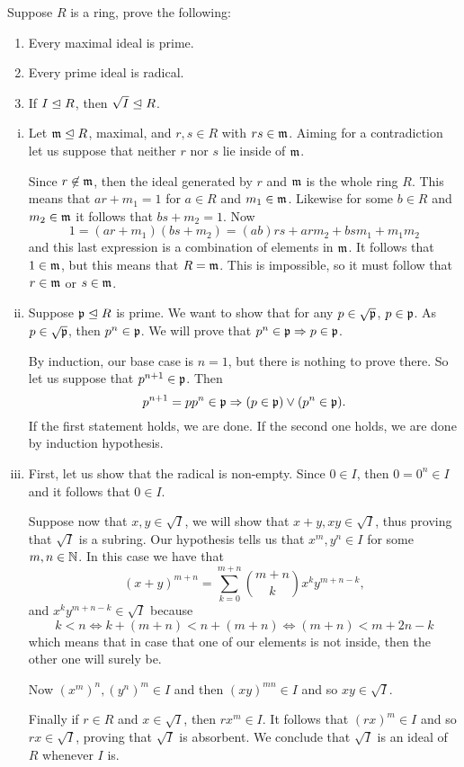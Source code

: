 \documentclass[12pt]{memoir}
\begin{document}
\begin{Ej}[2.1.1]
  Suppose $R$ is a ring, prove the following:
  \vspace{-0.4em}
  \begin{enumerate}
    \itemsep=-0.4em
    \item Every maximal ideal is prime.
    \item Every prime ideal is radical.
    \item If $I\trianglelefteq R$, then $\sqrt{I}\trianglelefteq R$.
  \end{enumerate}
\end{Ej}

\begin{ptcbr}
\begin{enumerate}[i)]
  \itemsep=-0.4em
    \item Let $\mathfrak{m}\trianglelefteq R$, maximal, and $r,s\in R$ with $rs\in\mathfrak{m}$. Aiming for a contradiction let us suppose that neither $r$ nor $s$ lie inside of $\mathfrak{m}$.\par 
    Since $r\not\in\mathfrak{m}$, then the ideal generated by $r$ and $\mathfrak{m}$ is the whole ring $R$. This means that $ar+m_1=1$ for $a\in R$ and $m_1\in\mathfrak{m}$. Likewise for some $b\in R$ and $m_2\in\mathfrak{m}$ it follows that $bs+m_2=1$. Now 
    $$1=(ar+m_1)(bs+m_2)=(ab)rs+arm_2+bsm_1+m_1m_2$$
    and this last expression is a combination of elements in $\mathfrak{m}$. It follows that $1\in\mathfrak{m}$, but this means that $R=\mathfrak{m}$. This is impossible, so it must follow that $r\in\mathfrak{m}$ or $s\in\mathfrak{m}$.
    \item Suppose $\mathfrak{p}\trianglelefteq R$ is prime. We want to show that for any $p\in\sqrt{\mathfrak{p}}$, $p\in\mathfrak{p}$. As $p\in\sqrt{\mathfrak{p}}$, then $p^n\in\mathfrak{p}$. We will prove that $p^n\in\mathfrak{p}\Rightarrow p\in\mathfrak{p}$.\par 
    By induction, our base case is $n=1$, but there is nothing to prove there. So let us suppose that $p^{n+1}\in\mathfrak{p}$. Then 
    $$p^{n+1}=pp^n\in\mathfrak{p}\Rightarrow (p\in\mathfrak{p})\lor(p^n\in\mathfrak{p}).$$
    If the first statement holds, we are done. If the second one holds, we are done by induction hypothesis.
    \item First, let us show that the radical is non-empty. Since $0\in I$, then $0=0^n\in I$ and it follows that $0\in I$.\par 
    Suppose now that $x,y\in\sqrt{I}$, we will show that $x+y, xy\in\sqrt{I}$, thus proving that $\sqrt I$ is a subring. Our hypothesis tells us that $x^m,y^n\in I$ for some $m,n\in\mathbb{N}$. In this case we have that
    $$(x+y)^{m+n}=\sum_{k=0}^{m+n}\binom{m+n}{k}x^ky^{m+n-k},$$
    and $x^ky^{m+n-k}\in\sqrt{I}$ because 
    $$k<n\iff k+(m+n)<n+(m+n)\iff (m+n)<m+2n-k$$
    which means that in case that one of our elements is not inside, then the other one will surely be. \par 
    Now $(x^m)^n,(y^n)^m\in I$ and then $(xy)^{mn}\in I$ and so $xy\in\sqrt{I}$.\par 
    Finally if $r\in R$ and $x\in\sqrt{I}$, then $rx^m\in I$. It follows that $(rx)^m\in I$ and so $rx\in\sqrt I$, proving that $\sqrt{I}$ is absorbent. We conclude that $\sqrt{I}$ is an ideal of $R$ whenever $I$ is.
\end{enumerate}
\end{ptcbr}
\end{document}
